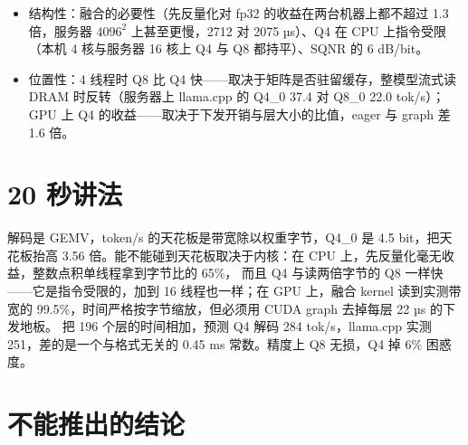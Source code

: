 \documentclass[11pt,a4paper]{ctexart}
\begin{document}
\begin{findingbox}[：哪些结论换机器不变]
\begin{itemize}
  \item 结构性：融合的必要性（先反量化对 fp32 的收益在两台机器上都不超过 1.3 倍，服务器 $4096^2$ 上甚至更慢，2712 对 2075 µs）、Q4 在 CPU 上指令受限（本机 4 核与服务器 16 核上 Q4 与 Q8 都持平）、SQNR 的 6 dB/bit。
  \item 位置性：4 线程时 Q8 比 Q4 快——取决于矩阵是否驻留缓存，整模型流式读 DRAM 时反转（服务器上 llama.cpp 的 Q4\_0 37.4 对 Q8\_0 22.0 tok/s）；
        GPU 上 Q4 的收益——取决于下发开销与层大小的比值，eager 与 graph 差 1.6 倍。
\end{itemize}
\end{findingbox}

\section{20 秒讲法}\label{sec:pitch}

解码是 GEMV，token/s 的天花板是带宽除以权重字节，Q4\_0 是 4.5 bit，把天花板抬高 3.56 倍。能不能碰到天花板取决于内核：在 CPU 上，先反量化毫无收益，整数点积单线程拿到字节比的 65\%，
而且 Q4 与读两倍字节的 Q8 一样快——它是指令受限的，加到 16 线程也一样；在 GPU 上，融合 kernel 读到实测带宽的 99.5\%，时间严格按字节缩放，但必须用 CUDA graph 去掉每层 22 µs 的下发地板。
把 196 个层的时间相加，预测 Q4 解码 284 tok/s，llama.cpp 实测 251，差的是一个与格式无关的 0.45 ms 常数。精度上 Q8 无损，Q4 掉 6\% 困惑度。

\section{不能推出的结论}\label{sec:caveats}
\end{document}
